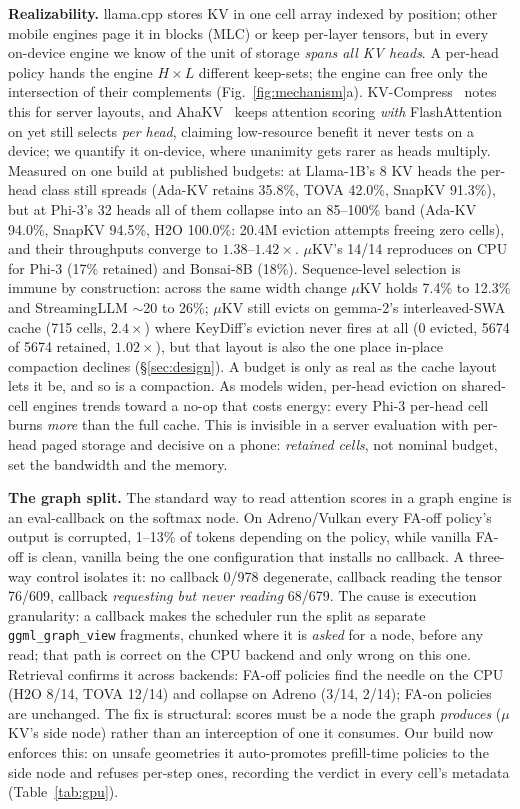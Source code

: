 \documentclass[sigconf,10pt]{acmart}
\begin{document}
\textbf{Realizability.} llama.cpp stores KV in one cell array indexed by position; other mobile engines page it in blocks (MLC) or keep per-layer tensors, but in every on-device engine we know of the unit of storage \emph{spans all KV heads}. A per-head policy hands the engine $H{\times}L$ different keep-sets; the engine can free only the intersection of their complements (Fig.~\ref{fig:mechanism}a). KV-Compress~\cite{kvcompress} notes this for server layouts, and AhaKV~\cite{ahakv} keeps attention scoring \emph{with} FlashAttention on yet still selects \emph{per head}, claiming low-resource benefit it never tests on a device; we quantify it on-device, where unanimity gets rarer as heads multiply. Measured on one build at published budgets: at Llama-1B's 8 KV heads the per-head class still spreads (Ada-KV retains 35.8\%, TOVA 42.0\%, SnapKV 91.3\%), but at Phi-3's 32 heads all of them collapse into an 85--100\% band (Ada-KV 94.0\%, SnapKV 94.5\%, H2O 100.0\%: 20.4M eviction attempts freeing zero cells), and their throughputs converge to $1.38$--$1.42\times$. $\mu$KV's 14/14 reproduces on CPU for Phi-3 (17\% retained) and Bonsai-8B (18\%). Sequence-level selection is immune by construction: across the same width change $\mu$KV holds 7.4\% to 12.3\% and StreamingLLM ${\sim}$20 to 26\%; $\mu$KV still evicts on gemma-2's interleaved-SWA cache (715 cells, $2.4\times$) where KeyDiff's eviction never fires at all (0 evicted, 5674 of 5674 retained, $1.02\times$), but that layout is also the one place in-place compaction declines (\S\ref{sec:design}). A budget is only as real as the cache layout lets it be, and so is a compaction. As models widen, per-head eviction on shared-cell engines trends toward a no-op that costs energy: every Phi-3 per-head cell burns \emph{more} than the full cache. This is invisible in a server evaluation with per-head paged storage and decisive on a phone: \emph{retained cells}, not nominal budget, set the bandwidth and the memory.

\textbf{The graph split.} The standard way to read attention scores in a graph engine is an eval-callback on the softmax node. On Adreno/Vulkan every FA-off policy's output is corrupted, 1--13\% of tokens depending on the policy, while vanilla FA-off is clean, vanilla being the one configuration that installs no callback. A three-way control isolates it: no callback 0/978 degenerate, callback reading the tensor 76/609, callback \emph{requesting but never reading} 68/679. The cause is execution granularity: a callback makes the scheduler run the split as separate \texttt{ggml\_graph\_view} fragments, chunked where it is \emph{asked} for a node, before any read; that path is correct on the CPU backend and only wrong on this one. Retrieval confirms it across backends: FA-off policies find the needle on the CPU (H2O 8/14, TOVA 12/14) and collapse on Adreno (3/14, 2/14); FA-on policies are unchanged. The fix is structural: scores must be a node the graph \emph{produces} ($\mu$KV's side node) rather than an interception of one it consumes. Our build now enforces this: on unsafe geometries it auto-promotes prefill-time policies to the side node and refuses per-step ones, recording the verdict in every cell's metadata (Table~\ref{tab:gpu}).
\end{document}
